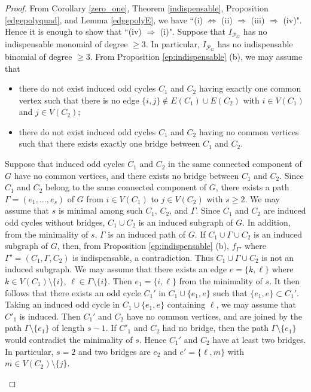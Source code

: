 \documentclass[10pt,a4paper]{amsart}
\numberwithin{thm}{section}
\numberwithin{equation}{section}
\def\epoly{{\mathcal P}_G}
\begin{document}
\begin{proof}
From Corollary \ref{zero_one}, Theorem \ref{indispensable}, Proposition \ref{edgepolyquad}, and Lemma \ref{edgepolyE}, we have
    ``(i) $\Leftrightarrow$ (ii) $\Rightarrow $ (iii) $\Rightarrow $ (iv)".
    Hence it is enough to show that ``(iv) $\Rightarrow $ (i)".
Suppose that %
        $I_{\epoly}$ has no indispensable monomial of degree $\ge 3$.
        In particular, $I_{\epoly}$ has no indispensable binomial of degree $\ge 3$.
        From Proposition \ref{ep:indispensable} (b), 
        we may assume that
        \begin{itemize}
            \item
            there do not exist induced odd cycles \(C_1\) and \(C_2\) having exactly one common vertex such that there is no edge
\(\{i,j\} \notin E(C_1)\cup E(C_2)\) with
\(i\in V(C_1)\) and \(j\in V(C_2)\);

 \item 
 there do not exist induced odd cycles \(C_1\) and \(C_2\) having no common vertices such that there exists exactly one bridge between \(C_1\) and \(C_2\).
        \end{itemize}

 Suppose that induced odd cycles $C_1$ and $C_2$ 
 in the same connected component of $G$ have no common
 vertices, and there exists no bridge between $C_1$ and $C_2$.
Since $C_1$ and $C_2$ belong to the same connected component of $G$, there exists a path $\Gamma = (e_1,\dots,e_s)$ of $G$
from $i \in V(C_1)$ to $j \in V(C_2)$ with $s \ge 2$.
We may assume that $s$ is minimal among such $C_1$, $C_2$, and $\Gamma$.
Since $C_1$ and $C_2$ are induced odd cycles without bridges,
$C_1 \cup C_2$ is an induced subgraph of $G$.
In addition, from the minimality of $s$, $\Gamma$ is an induced path of $G$.
If $C_1 \cup \Gamma \cup C_2$ is an induced subgraph of $G$, then, 
from Proposition \ref{ep:indispensable} (b), $f_{\Gamma'}$ where $\Gamma' =(C_1, \Gamma ,C_2)$
 is indispensable, a contradiction. 
Thus $C_1 \cup \Gamma \cup C_2$ is not an induced subgraph.
We may assume that there exists an edge $e=\{k,\ell\}$ where $k \in V(C_1) \setminus \{i\}$, $\ell \in \Gamma \setminus \{i\}$.
Then $e_1 = \{i,\ell\}$ from the minimality of $s$.
It then follows that there exists an odd cycle $C_1'$ in $C_1 \cup \{e_1, e\}$
such that $\{e_1, e\} \subset C_1'$.
Taking an induced odd cycle in \(C_1\cup\{e_1,e\}\) containing \(\ell\),
we may assume that \(C'_1\) is induced.
Then 
$C_1'$ and $C_2$ have no common vertices,
and are joined by the path $\Gamma \setminus \{e_1\}$ of length $s-1$.
If \(C'_1\) and \(C_2\) had no bridge, then the path
\(\Gamma\setminus\{e_1\}\) would contradict the minimality of \(s\).
Hence 
$C_1'$ and $C_2$ have at least two bridges.
In particular, $s=2$ and two bridges are $e_2$
and $e'=\{\ell, m\}$ with $m \in V(C_2) \setminus \{j\}$.
\begin{center}  
\begin{tikzpicture}[scale=0.7,transform shape,
    vertex/.style={circle,draw,minimum size=2mm,inner sep=0pt},
    every node/.style={font=\large}
]


\end{tikzpicture}
\end{center}
\end{proof}
\end{document}
